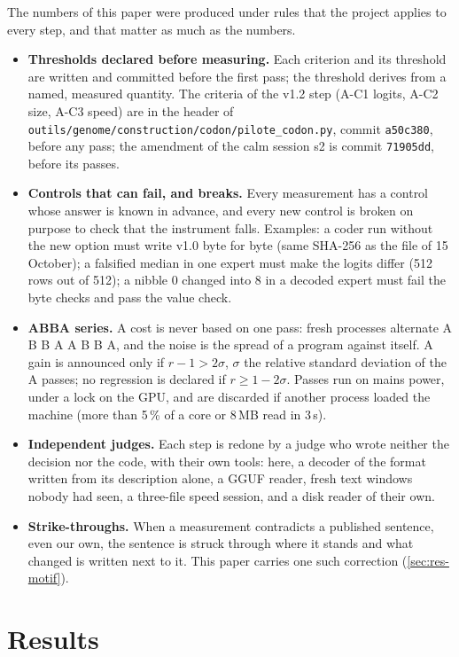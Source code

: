 \documentclass[11pt, a4paper]{article}
\theoremstyle{remark}
\newcommand{\fichier}[1]{\textsf{\footnotesize\nolinkurl{#1}}}
\begin{document}
The numbers of this paper were produced under rules that the project applies to every step, and that matter as much as the numbers.
\begin{itemize}
\item \textbf{Thresholds declared before measuring.} Each criterion and its threshold are written and committed before the first pass; the threshold derives from a named, measured quantity. The criteria of the v1.2 step (A-C1 logits, A-C2 size, A-C3 speed) are in the header of \fichier{outils/genome/construction/codon/pilote\_codon.py}, commit \texttt{a50c380}, before any pass; the amendment of the calm session s2 is commit \texttt{71905dd}, before its passes.
\item \textbf{Controls that can fail, and breaks.} Every measurement has a control whose answer is known in advance, and every new control is broken on purpose to check that the instrument falls. Examples: a coder run without the new option must write v1.0 byte for byte (same SHA-256 as the file of 15 October); a falsified median in one expert must make the logits differ (512 rows out of 512); a nibble 0 changed into 8 in a decoded expert must fail the byte checks and pass the value check.
\item \textbf{ABBA series.} A cost is never based on one pass: fresh processes alternate A B B A A B B A, and the noise is the spread of a program against itself. A gain is announced only if $r - 1 > 2\sigma$, $\sigma$ the relative standard deviation of the A passes; no regression is declared if $r \ge 1 - 2\sigma$. Passes run on mains power, under a lock on the GPU, and are discarded if another process loaded the machine (more than 5\,\% of a core or 8\,MB read in 3\,s).
\item \textbf{Independent judges.} Each step is redone by a judge who wrote neither the decision nor the code, with their own tools: here, a decoder of the format written from its description alone, a GGUF reader, fresh text windows nobody had seen, a three-file speed session, and a disk reader of their own.
\item \textbf{Strike-throughs.} When a measurement contradicts a published sentence, even our own, the sentence is struck through where it stands and what changed is written next to it. This paper carries one such correction (\cref{sec:res-motif}).
\end{itemize}

\section{Results}\label{sec:resultats}
\end{document}
